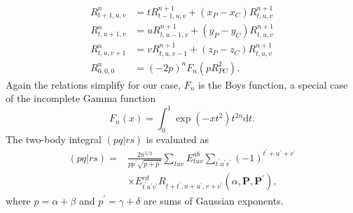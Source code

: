 \documentclass[final,3p,times,twocolumn]{elsarticle}
\begin{document}
	\begin{equation}
		\begin{aligned} 
			R_{t+1, u, v}^{n} &=t R_{t-1, u, v}^{n+1}+(x_P - x_C) R_{t, u, v}^{n+1} \\ 
			R_{t, u+1, v}^{n} &=u R_{t, u-1, v}^{n+1}+(y_P - y_C) R_{t, u, v}^{n+1} \\ 
			R_{t, u, v+1}^{n} &=v R_{t, u, v-1}^{n+1}+(z_P - z_C) R_{t, u, v}^{n+1} \\ 
			R_{0,0,0}^{n} &=(-2 p)^{n} F_{n}\left(p R_{P C}^{2}\right).
		\end{aligned}
	\end{equation}
	Again the relations simplify for our case, $F_n$ is the Boys function, a special case of the incomplete Gamma function
	\begin{equation}
		F_{n}(x)=\int_{0}^{1} \exp \left(-x t^{2}\right) t^{2 n} \mathrm{d} t.
	\end{equation}
	The two-body integral $(pq|rs)$ is evaluated as~\cite{helgaker1995gaussian}
	\begin{equation}
		\begin{aligned} (pq|rs)=& \frac{2 \pi^{5 / 2}}{p p^{\prime} \sqrt{p+p^{\prime}}} \sum_{t u v} E_{t u v}^{a b} \sum_{t^{\prime} u^{\prime} v^{\prime}}(-1)^{t^{\prime}+u^{\prime}+v^{\prime}} \\ & \times E_{t^{\prime} u^{\prime} v^{\prime}}^{c d} R_{t+t^{\prime}, u+u^{\prime}, v+v^{\prime}}\left(\alpha, \mathbf{P}, \mathbf{P}^{\prime}\right),
		\end{aligned}
	\end{equation}
	where $p = \alpha + \beta$ and $p^\prime = \gamma + \delta$ are sums of Gaussian exponents. 
\end{document}
